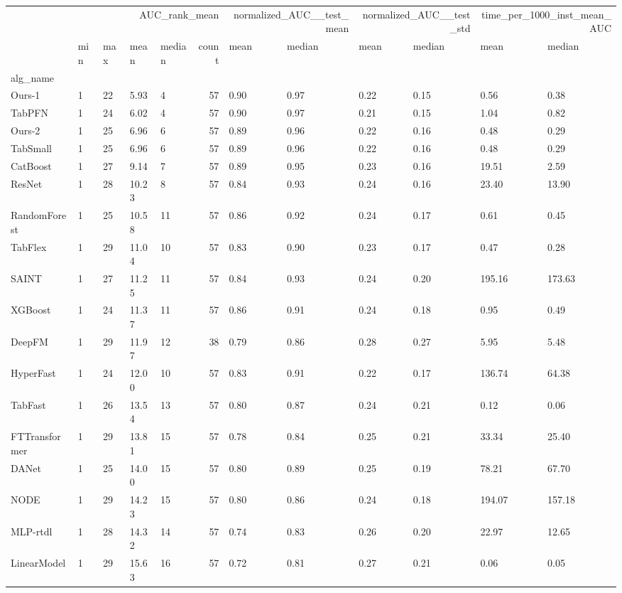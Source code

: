 \begin{tabular}{lllllrllllll}
\toprule
 & \multicolumn{5}{r}{AUC_rank_mean} & \multicolumn{2}{r}{normalized_AUC__test_mean} & \multicolumn{2}{r}{normalized_AUC__test_std} & \multicolumn{2}{r}{time_per_1000_inst_mean_AUC} \\
 & min & max & mean & median & count & mean & median & mean & median & mean & median \\
alg_name &  &  &  &  &  &  &  &  &  &  &  \\
\midrule
Ours-1 & 1 & 22 & 5.93 & 4 & 57 & 0.90 & 0.97 & 0.22 & 0.15 & 0.56 & 0.38 \\
TabPFN & 1 & 24 & 6.02 & 4 & 57 & 0.90 & 0.97 & 0.21 & 0.15 & 1.04 & 0.82 \\
Ours-2 & 1 & 25 & 6.96 & 6 & 57 & 0.89 & 0.96 & 0.22 & 0.16 & 0.48 & 0.29 \\
TabSmall & 1 & 25 & 6.96 & 6 & 57 & 0.89 & 0.96 & 0.22 & 0.16 & 0.48 & 0.29 \\
CatBoost & 1 & 27 & 9.14 & 7 & 57 & 0.89 & 0.95 & 0.23 & 0.16 & 19.51 & 2.59 \\
ResNet & 1 & 28 & 10.23 & 8 & 57 & 0.84 & 0.93 & 0.24 & 0.16 & 23.40 & 13.90 \\
RandomForest & 1 & 25 & 10.58 & 11 & 57 & 0.86 & 0.92 & 0.24 & 0.17 & 0.61 & 0.45 \\
TabFlex & 1 & 29 & 11.04 & 10 & 57 & 0.83 & 0.90 & 0.23 & 0.17 & 0.47 & 0.28 \\
SAINT & 1 & 27 & 11.25 & 11 & 57 & 0.84 & 0.93 & 0.24 & 0.20 & 195.16 & 173.63 \\
XGBoost & 1 & 24 & 11.37 & 11 & 57 & 0.86 & 0.91 & 0.24 & 0.18 & 0.95 & 0.49 \\
DeepFM & 1 & 29 & 11.97 & 12 & 38 & 0.79 & 0.86 & 0.28 & 0.27 & 5.95 & 5.48 \\
HyperFast & 1 & 24 & 12.00 & 10 & 57 & 0.83 & 0.91 & 0.22 & 0.17 & 136.74 & 64.38 \\
TabFast & 1 & 26 & 13.54 & 13 & 57 & 0.80 & 0.87 & 0.24 & 0.21 & 0.12 & 0.06 \\
FTTransformer & 1 & 29 & 13.81 & 15 & 57 & 0.78 & 0.84 & 0.25 & 0.21 & 33.34 & 25.40 \\
DANet & 1 & 25 & 14.00 & 15 & 57 & 0.80 & 0.89 & 0.25 & 0.19 & 78.21 & 67.70 \\
NODE & 1 & 29 & 14.23 & 15 & 57 & 0.80 & 0.86 & 0.24 & 0.18 & 194.07 & 157.18 \\
MLP-rtdl & 1 & 28 & 14.32 & 14 & 57 & 0.74 & 0.83 & 0.26 & 0.20 & 22.97 & 12.65 \\
LinearModel & 1 & 29 & 15.63 & 16 & 57 & 0.72 & 0.81 & 0.27 & 0.21 & 0.06 & 0.05 \\

\end{tabular}
